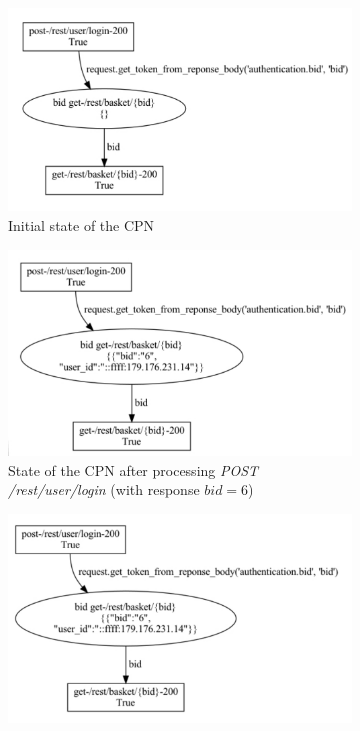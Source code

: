 \begin{figure}
     \centering
    \begin{subfigure}[b]{0.3\textwidth}
        \includegraphics[width=\textwidth]{figures/Juice_Shop_output_challenge1_a}
        \caption{Initial state of the CPN}
        \label{fig:Juice_Shop_output_challenge1_a}
    \end{subfigure}
        \begin{subfigure}[b]{0.3\textwidth}
        \includegraphics[width=\textwidth]{figures/Juice_Shop_output_challenge1_b}
        \caption{State of the CPN after processing \textit{POST /rest/user/login} (with response $bid=6$)}
        \label{fig:Juice_Shop_output_challenge1_b}
    \end{subfigure}
        \begin{subfigure}[b]{0.3\textwidth}
        \includegraphics[width=\textwidth]{figures/Juice_Shop_output_challenge1_c}

\end{subfigure}
\end{figure}
